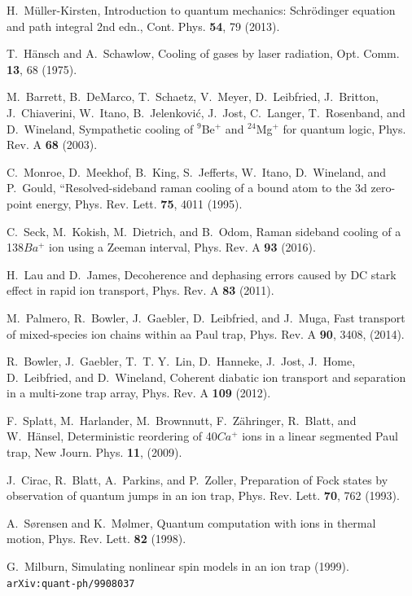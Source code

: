 \documentclass[12pt,a4paper]{amsart}
\numberwithin{equation}{section}
\theoremstyle{plain}
\theoremstyle{definition}
\begin{document}
\begin{thebibliography}{40}
H.~M\"{u}ller-Kirsten, Introduction to quantum mechanics: Schr\"{o}dinger equation and path integral 2nd edn., Cont. Phys. \textbf{54}, 79 (2013).

T.~H\"{a}nsch and A.~Schawlow, Cooling of gases by laser radiation, Opt. Comm. \textbf{13}, 68 (1975).

M.~Barrett, B.~DeMarco, T.~Schaetz, V.~Meyer, D.~Leibfried, J.~Britton,
  J.~Chiaverini, W.~Itano, B.~Jelenkovi\'{c}, J.~Jost, C.~Langer, T.~Rosenband, and
  D.~Wineland, Sympathetic cooling of $^{9}$Be$^{+}$ and $^{24}$Mg$^{+}$ for
  quantum logic, Phys. Rev. A \textbf{68} (2003).

C.~Monroe, D.~Meekhof, B.~King, S.~Jefferts, W.~Itano, D.~Wineland, and P.~Gould, ``Resolved-sideband raman cooling of a bound atom to the 3d zero-point energy, Phys. Rev. Lett. \textbf{75}, 4011 (1995).

C.~Seck, M.~Kokish, M.~Dietrich, and B.~Odom, Raman sideband cooling of a 138$Ba^+$ ion using a Zeeman interval, Phys. Rev. A \textbf{93} (2016).

H.~Lau and D.~James, Decoherence and dephasing errors caused by DC stark effect in rapid ion transport, Phys. Rev. A \textbf{83} (2011).

M.~Palmero, R.~Bowler, J.~Gaebler, D.~Leibfried, and J.~Muga, Fast transport of mixed-species ion chains within aa Paul trap, Phys. Rev. A \textbf{90}, 3408, (2014).

R.~Bowler, J.~Gaebler, T.~T. Y.~Lin, D.~Hanneke, J.~Jost, J.~Home,
  D.~Leibfried, and D.~Wineland, Coherent diabatic ion transport and
  separation in a multi-zone trap array, Phys. Rev. A \textbf{109} (2012).

F.~Splatt, M.~Harlander, M.~Brownnutt, F.~Z\"{a}hringer, R.~Blatt, and W.~H\"{a}nsel,
  Deterministic reordering of 40$Ca^+$ ions in a linear segmented Paul trap, New Journ. Phys. \textbf{11}, (2009).

J.~Cirac, R.~Blatt, A.~Parkins, and P.~Zoller, Preparation of Fock states by observation of quantum jumps in an ion trap, Phys. Rev. Lett. \textbf{70}, 762 (1993).

A.~S\o rensen and K.~M\o lmer, Quantum computation with ions in thermal motion, Phys. Rev. Lett. \textbf{82} (1998).

G.~Milburn, Simulating nonlinear spin models in an ion trap (1999). \texttt{arXiv:quant-ph/9908037}


\end{thebibliography}
\end{document}
